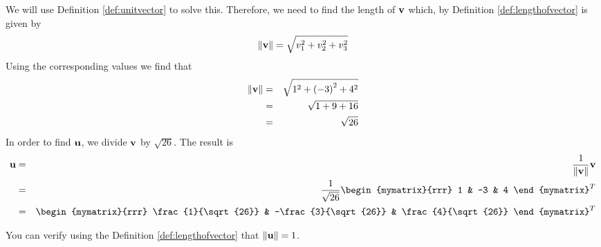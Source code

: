 \begin{solution}
We will use Definition \ref{def:unitvector} to solve this. 
Therefore, we need to find the length of ${\bf v}$ which, by Definition \ref{def:lengthofvector}
is given by 
\begin{equation*}
\|
{\bf v}
\|
= \sqrt{ v_{1}^2 + v_{2}^2+ v_{3}^2}
\end{equation*}
Using the corresponding  values we find that
\begin{eqnarray*}
\|
{\bf v}
\|
&=& \sqrt{ 1^2 + \left(-3 \right)^2 + 4^2} \\
&=& \sqrt{ 1 + 9 + 16} \\
&=& \sqrt{26} 
\end{eqnarray*}
In order to find ${\bf u}$, we divide ${\bf v}$ by $\sqrt{26}$.
The result is 
\begin{eqnarray*}
\vect{u}
&=&
\frac{1}{\vectlength \vect{v} \vectlength}
\vect{v} \\
&=&
\frac{1}{\sqrt{26}}
\begin{mymatrix}{rrr}
1 & -3 & 4
\end{mymatrix}^T \\
&=&
\begin{mymatrix}{rrr}
\frac{1}{\sqrt{26}} & -\frac{3}{\sqrt{26}} & \frac{4}{\sqrt{26}}
\end{mymatrix}^T
\end{eqnarray*}

You can verify using the Definition \ref{def:lengthofvector} that $\| {\bf u} \| = 1 $. 
\end{solution}
